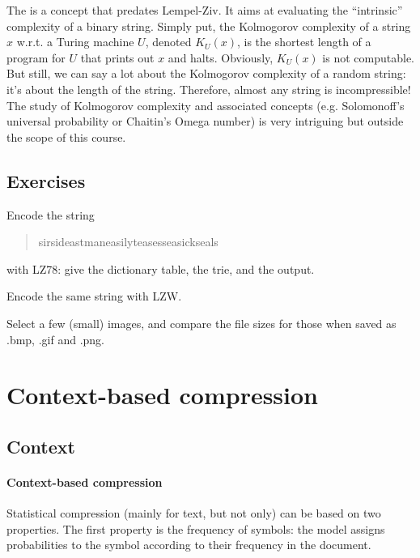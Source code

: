 \documentclass[a4paper, 11pt, openany]{book}
\begin{document}
The  is a concept that predates Lempel-Ziv. It aims at evaluating the ``intrinsic'' complexity of a binary string. Simply put, the Kolmogorov complexity of a string $x$ w.r.t. a Turing machine $U$, denoted $K_U(x)$, is the shortest length of a program for $U$ that prints out $x$ and halts. Obviously, $K_U(x)$ is not computable. But still, we can say a lot about the Kolmogorov complexity of a random string: it's about the length of the string. Therefore, almost any string is incompressible! The study of Kolmogorov complexity and associated concepts (e.g. Solomonoff's universal probability or Chaitin's Omega number) is very intriguing but outside the scope of this course.



 \subsection{Exercises}

\begin{exercise}
Encode the string
\begin{quote}
    sir\textvisiblespace sid\textvisiblespace eastman\textvisiblespace easily\textvisiblespace teases\textvisiblespace sea\textvisiblespace sick\textvisiblespace seals
\end{quote}
with LZ78: give the dictionary table, the trie, and the output.

Encode the same string with LZW.
\end{exercise}


\begin{exercise}
Select a few (small) images, and compare the file sizes for those when saved as .bmp, .gif and .png.
\end{exercise}




\section{Context-based compression}
\label{sec:05}



\subsection{Context}

\paragraph{Context-based compression} Statistical compression (mainly for text, but not only) can be based on two properties. The first property is the frequency of symbols: the model assigns probabilities to the symbol according to their frequency in the document.
\end{document}
